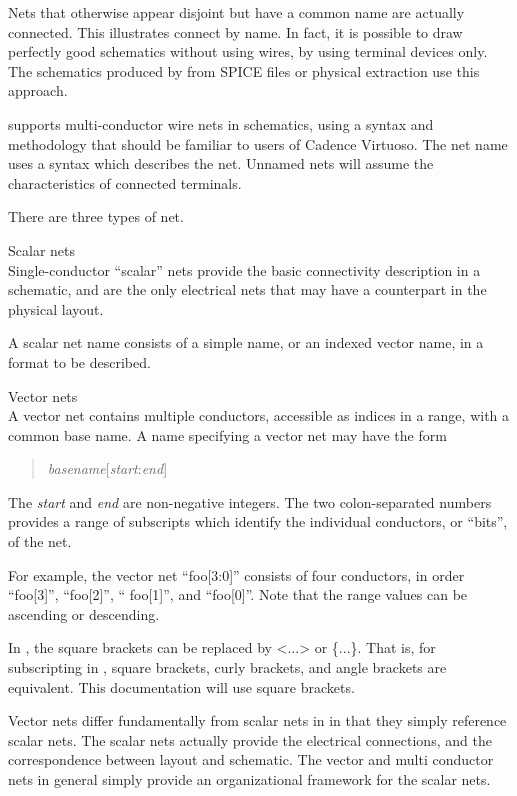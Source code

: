 Nets that otherwise appear disjoint but have a common name are
actually connected.  This illustrates connect by name.  In fact, it is
possible to draw perfectly good schematics without using wires, by
using terminal devices only.  The schematics produced by {\Xic} from
SPICE files or physical extraction use this approach.

{\Xic} supports multi-conductor wire nets in schematics, using a
syntax and methodology that should be familiar to users of Cadence
Virtuoso.  The net name uses a syntax which describes the net. 
Unnamed nets will assume the characteristics of connected terminals. 

There are three types of net.
\begin{description}
\item{Scalar nets}\\
Single-conductor ``scalar'' nets provide the basic connectivity
description in a schematic, and are the only electrical nets that may
have a counterpart in the physical layout.

A scalar net name consists of a simple name, or an indexed vector
name, in a format to be described.

\item{Vector nets}\\
A vector net contains multiple conductors, accessible as indices in a
range, with a common base name.  A name specifying a vector net may
have the form
\begin{quote}
{\it basename\/}{\vt [}{\it start\/}{\vt :}{\it end\/}{\vt ]}
\end{quote}

The {\it start} and {\it end} are non-negative integers.  The two
colon-separated numbers provides a range of subscripts which identify
the individual conductors, or ``bits'', of the net.

For example, the vector net ``{\vt foo[3:0]}'' consists of four
conductors, in order ``{\vt foo[3]}'', ``{\vt foo[2]}'', ``{\vt
foo[1]}'', and ``{\vt foo[0]}''.  Note that the range values can be
ascending or descending.

In {\Xic}, the square brackets can be replaced by {\vt <...>} or {\vt
\{...\}}.  That is, for subscripting in {\Xic}, square brackets, curly
brackets, and angle brackets are equivalent.  This documentation will
use square brackets.

Vector nets differ fundamentally from scalar nets in {\Xic} in that
they simply reference scalar nets.  The scalar nets actually provide
the electrical connections, and the correspondence between layout and
schematic.  The vector and multi conductor nets in general simply
provide an organizational framework for the scalar nets.


\end{description}
